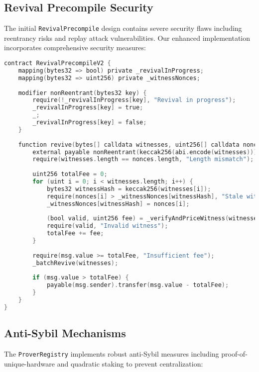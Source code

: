 \documentclass{article}
\begin{document}
\subsection{Revival Precompile Security}

The initial \texttt{RevivalPrecompile} design contains severe security flaws including reentrancy risks and replay attack vulnerabilities. Our enhanced implementation incorporates comprehensive security measures:

\begin{lstlisting}[language=C,caption={Enhanced Revival Precompile with Security Protections},label={lst:revival}]
contract RevivalPrecompileV2 {
    mapping(bytes32 => bool) private _revivalInProgress;
    mapping(bytes32 => uint256) private _witnessNonces;
    
    modifier nonReentrant(bytes32 key) {
        require(!_revivalInProgress[key], "Revival in progress");
        _revivalInProgress[key] = true;
        _;
        _revivalInProgress[key] = false;
    }
    
    function revive(bytes[] calldata witnesses, uint256[] calldata nonces) 
        external payable nonReentrant(keccak256(abi.encode(witnesses))) {
        require(witnesses.length == nonces.length, "Length mismatch");
        
        uint256 totalFee = 0;
        for (uint i = 0; i < witnesses.length; i++) {
            bytes32 witnessHash = keccak256(witnesses[i]);
            require(nonces[i] > _witnessNonces[witnessHash], "Stale witness");
            _witnessNonces[witnessHash] = nonces[i];
            
            (bool valid, uint256 fee) = _verifyAndPriceWitness(witnesses[i]);
            require(valid, "Invalid witness");
            totalFee += fee;
        }
        
        require(msg.value >= totalFee, "Insufficient fee");
        _batchRevive(witnesses);
        
        if (msg.value > totalFee) {
            payable(msg.sender).transfer(msg.value - totalFee);
        }
    }
}
\end{lstlisting}

\subsection{Anti-Sybil Mechanisms}

The \texttt{ProverRegistry} implements robust anti-Sybil measures including proof-of-unique-hardware and quadratic staking to prevent centralization:
\end{document}
